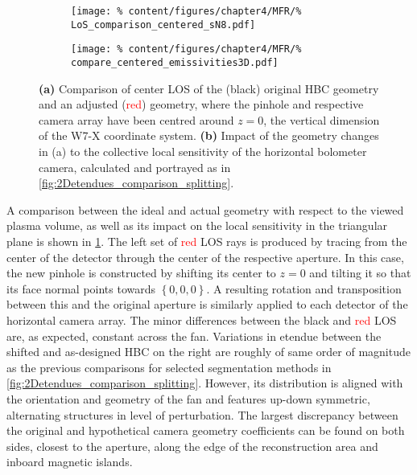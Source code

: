             \begin{figure}[t]%
                \centering%
                \begin{subfigure}{0.4\textwidth}%
                    \texttt{[image: \%
                        content/figures/chapter4/MFR/\%
                        LoS\_comparison\_centered\_sN8.pdf]}%
                    \caption{}%
                \end{subfigure}%
                \hfill%
                \begin{subfigure}{0.55\textwidth}%
                    \texttt{[image: \%
                        content/figures/chapter4/MFR/\%
                        compare\_centered\_emissivities3D.pdf]}%
                    \caption{}%
                \end{subfigure}%
                \caption{\textbf{(a)} Comparison of center LOS of the (black) original HBC geometry and an adjusted (\textcolor{red}{red}) geometry, where the pinhole and respective camera array have been centred around $z=0$, the vertical dimension of the W7-X coordinate system. \textbf{(b)} Impact of the geometry changes in (a) to the collective local sensitivity of the horizontal bolometer camera, calculated and portrayed as in \cref{fig:2Detendues_comparison_splitting}.}\label{fig:geometry_change_centered}%
            \end{figure}%
%
            A comparison between the ideal and actual geometry with respect to the viewed plasma volume, as well as its impact on the local sensitivity in the triangular plane is shown in \cref{fig:geometry_change_centered}. The left set of \textcolor{red}{red} LOS rays is produced by tracing from the center of the detector through the center of the respective aperture. In this case, the new pinhole is constructed by shifting its center to $z=0$ and tilting it so that its face normal points towards $\left\{0, 0, 0\right\}$. A resulting rotation and transposition between this and the original aperture is similarly applied to each detector of the horizontal camera array. The minor differences between the black and \textcolor{red}{red} LOS are, as expected, constant across the fan. Variations in etendue between the shifted and as-designed HBC on the right are roughly of same order of magnitude as the previous comparisons for selected segmentation methods in \cref{fig:2Detendues_comparison_splitting}. However, its distribution is aligned with the orientation and geometry of the fan and features up-down symmetric, alternating structures in level of perturbation. The largest discrepancy between the original and hypothetical camera geometry coefficients can be found on both sides, closest to the aperture, along the edge of the reconstruction area and inboard magnetic islands.\\%
